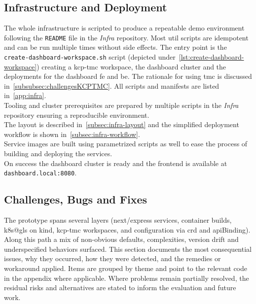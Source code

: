 \documentclass[11pt, a4paper, oneside, listof=totoc]{scrartcl}
\begin{document}
        \subsection{Infrastructure and Deployment}\label{subsec:infrastructureAndDeployment}
            The whole infrastructure is scripted to produce a repeatable demo environment following
            the \texttt{README} file in the \textit{Infra} repository.
            Most util scripts are idempotent and can be run multiple times without side effects.
            The entry point is the \texttt{create-dashboard-workspace.sh} script
            (depicted under~\autoref{lst:create-dashboard-workspace}) creating a \gls{kcp}-\gls{tmc}
            workspace, the dashboard cluster and the deployments for the dashboard \gls{fe} and
            \gls{be}.
            The rationale for using \gls{tmc} is discussed in~\autoref{subsubsec:challengesKCPTMC}.
            All scripts and manifests are listed in~\autoref{app:infra}.\\
            Tooling and cluster prerequisites are prepared by multiple scripts in the \textit{Infra}
            repository ensuring a reproducible environment.\\
            The layout is described in~\autoref{subsec:infra-layout} and the simplified deployment
            workflow is shown in~\autoref{subsec:infra-workflow}.\\
            Service images are built using parametrized scripts as well to ease the process of
            building and deploying the services.\\
            On success the dashboard cluster is ready and the frontend is available at
            \texttt{dashboard.local:8080}.

        \subsection{Challenges, Bugs and Fixes}\label{subsec:challengesAndBugs}
            The prototype spans several layers (\gls{next}/\gls{express} services, container builds,
            \gls{k8s@gls} on \gls{kind}, \gls{kcp}-\gls{tmc} workspaces, and configuration via
            \gls{crd} and \gls{api}Binding).
            Along this path a mix of non-obvious defaults, complexities, version drift and
            underspecified behaviors surfaced.
            This section documents the most consequential issues, why they occurred, how they were
            detected, and the remedies or workaround applied.
            Items are grouped by theme and point to the relevant code in the appendix where
            applicable.
            Where problems remain partially resolved, the residual risks and alternatives are stated
            to inform the evaluation and future work.
\end{document}
